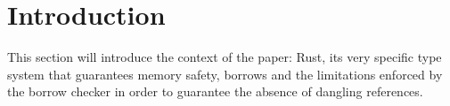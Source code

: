 \section{Introduction}\label{sec:introduction}

This section will introduce the context of the paper: Rust, its very
specific type system that guarantees memory safety, borrows and the
limitations enforced by the borrow checker in order to guarantee the absence
of dangling references.
